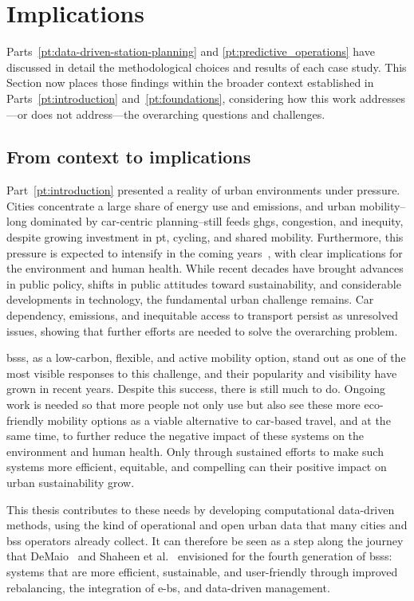 \section{Implications}

Parts~\ref{pt:data-driven-station-planning} and \ref{pt:predictive_operations} have discussed in detail the methodological choices and results of each case study. This Section now places those findings within the broader context established in Parts~\ref{pt:introduction} and~\ref{pt:foundations}, considering how this work addresses—or does not address—the overarching questions and challenges.

\subsection{From context to implications}

Part~\ref{pt:introduction} presented a reality of urban environments under pressure. Cities concentrate a large share of energy use and emissions, and urban mobility--long dominated by car-centric planning--still feeds \acp{ghg}, congestion, and inequity, despite growing investment in \ac{pt}, cycling, and shared mobility. Furthermore, this pressure is expected to intensify in the coming years~\cite{UN_SDG11_2015}, with clear implications for the environment and human health. While recent decades have brought advances in public policy, shifts in public attitudes toward sustainability, and considerable developments in technology, the fundamental urban challenge remains. Car dependency, emissions, and inequitable access to transport persist as unresolved issues, showing that further efforts are needed to solve the overarching problem.

\acp{bss}, as a low-carbon, flexible, and active mobility option, stand out as one of the most visible responses to this challenge, and their popularity and visibility have grown in recent years. Despite this success, there is still much to do. Ongoing work is needed so that more people not only use but also see these more eco-friendly mobility options as a viable alternative to car-based travel, and at the same time, to further reduce the negative impact of these systems on the environment and human health. Only through sustained efforts to make such systems more efficient, equitable, and compelling can their positive impact on urban sustainability grow.

This thesis contributes to these needs by developing computational data-driven methods, using the kind of operational and open urban data that many cities and \ac{bss} operators already collect. It can therefore be seen as a step along the journey that DeMaio~\cite{DeMaio2009} and Shaheen et al.~\cite{Shaheen2010} envisioned for the fourth generation of \acp{bss}: systems that are more efficient, sustainable, and user-friendly through improved rebalancing, the integration of \acp{e-b}, and data-driven management.



